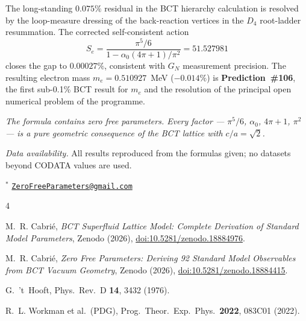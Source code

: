 \documentclass[10pt,twocolumn]{article}
\begin{document}
The long-standing $0.075\%$ residual in the BCT hierarchy calculation is resolved by the
loop-measure dressing of the back-reaction vertices in the $D_4$ root-ladder resummation. The
corrected self-consistent action
\begin{equation}
S_e = \frac{\pi^5/6}{1 - \alpha_0(4\pi+1)/\pi^2} = 51.527981
\label{eq:Seconc}
\end{equation}
closes the gap to $0.00027\%$, consistent with $G_N$ measurement precision. The resulting
electron mass $m_e = 0.510927$~MeV ($-0.014\%$) is \textbf{Prediction~\#106}, the first
sub-0.1\% BCT result for $m_e$ and the resolution of the principal open numerical problem of
the programme.

\textit{The formula contains zero free parameters. Every factor --- $\pi^5/6$, $\alpha_0$,
$4\pi+1$, $\pi^2$ --- is a pure geometric consequence of the BCT lattice with $c/a = \sqrt{2}$.}

\smallskip
\noindent\textit{Data availability.} All results reproduced from the formulas given; no datasets
beyond CODATA values are used.

\bigskip
\noindent$^*$ \href{mailto:ZeroFreeParameters@gmail.com}{\texttt{ZeroFreeParameters@gmail.com}}

\begin{thebibliography}{4}

M.~R. Cabri\'{e}, \textit{BCT Superfluid Lattice Model: Complete Derivation of Standard Model
Parameters}, Zenodo (2026),
\href{https://doi.org/10.5281/zenodo.18884976}{doi:10.5281/zenodo.18884976}.

M.~R. Cabri\'{e}, \textit{Zero Free Parameters: Deriving 92 Standard Model Observables from
BCT Vacuum Geometry}, Zenodo (2026),
\href{https://doi.org/10.5281/zenodo.18884415}{doi:10.5281/zenodo.18884415}.

G.~'t~Hooft, Phys.\ Rev.\ D \textbf{14}, 3432 (1976).

R.~L. Workman et al.\ (PDG), Prog.\ Theor.\ Exp.\ Phys.\ \textbf{2022}, 083C01 (2022).

\end{thebibliography}
\end{document}
